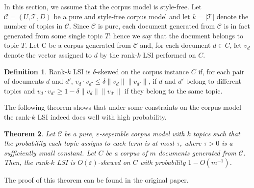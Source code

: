 \documentclass[a4paper,11pt,DIV=15]{scrartcl} %
\renewcommand{\epsilon}{\varepsilon}
\theoremstyle{plain}
\newtheorem{theorem}{Theorem}
\theoremstyle{definition}
\newtheorem{definition}[theorem]{Definition}
\begin{document}
In this section, we assume that the corpus model is style-free.
Let $\mathscr{C} = (U,\mathscr{T}, D)$ be a pure and style-free corpus model and let $k = |\mathscr{T}|$ denote the number of topics in $\mathscr{C}$. Since $\mathscr{C}$ is pure, each document generated from $\mathscr{C}$ is in fact generated from some single topic $T$: hence we say that the document belongs to topic $T$.
Let C be a corpus generated from $\mathscr{C}$ and, for each document $d \in C$, let $v_d$ denote the vector assigned to $d$ by the rank-$k$ LSI performed on $C$.



\begin{definition}
    Rank-$k$ LSI is $\delta$-skewed on the corpus instance $C$ if, for each pair of documents $d$ and $d'$, $v_d \cdot v_{d'} \leq \delta \lVert v_d \rVert \lVert v_{d'}\rVert$,  if $d$ and $d'$ belong to different topics and $v_d \cdot v_{d'} \geq 1 - \delta  \lVert v_d \rVert \lVert v_{d'}\rVert$  if they belong to the same topic.
\end{definition}
The following theorem shows that under some constraints on the corpus model the rank-$k$ LSI indeed does well with high probability.

\begin{theorem}
    Let $\mathscr{C}$ be a pure, $\epsilon$-seperable corpus model with $k$ topics such that the probability each topic assigns to each term is at most $\tau$, where $\tau > 0$ is a sufficiently small constant. Let $C$ be a corpus of $m$ documents generated from $\mathscr{C}$. Then, the rank-$k$ LSI is $O(\epsilon)$-skewed on $C$ with probability $1-O(m^{-1})$.
\end{theorem}

The proof of this theorem can be found in the original paper.
\end{document}
